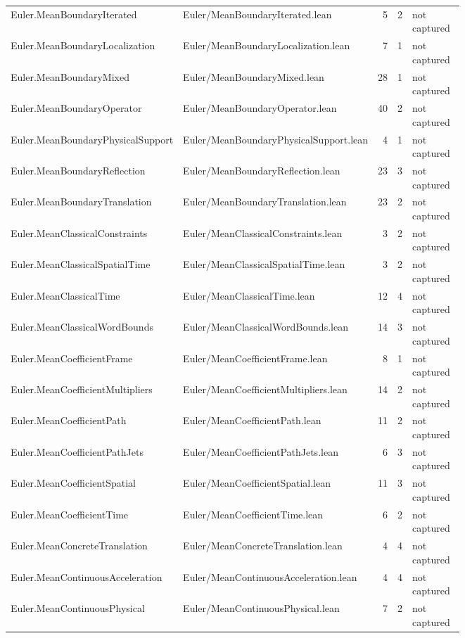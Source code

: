 \documentclass[10pt]{article}
\begin{document}
\begin{longtable}{p{0.28\linewidth}p{0.27\linewidth}r r p{0.20\linewidth}}
Euler.MeanBoundaryIterated & Euler/MeanBoundaryIterated.lean & 5 & 2 & not captured\\
Euler.MeanBoundaryLocalization & Euler/MeanBoundaryLocalization.lean & 7 & 1 & not captured\\
Euler.MeanBoundaryMixed & Euler/MeanBoundaryMixed.lean & 28 & 1 & not captured\\
Euler.MeanBoundaryOperator & Euler/MeanBoundaryOperator.lean & 40 & 2 & not captured\\
Euler.MeanBoundaryPhysicalSupport & Euler/MeanBoundaryPhysicalSupport.lean & 4 & 1 & not captured\\
Euler.MeanBoundaryReflection & Euler/MeanBoundaryReflection.lean & 23 & 3 & not captured\\
Euler.MeanBoundaryTranslation & Euler/MeanBoundaryTranslation.lean & 23 & 2 & not captured\\
Euler.MeanClassicalConstraints & Euler/MeanClassicalConstraints.lean & 3 & 2 & not captured\\
Euler.MeanClassicalSpatialTime & Euler/MeanClassicalSpatialTime.lean & 3 & 2 & not captured\\
Euler.MeanClassicalTime & Euler/MeanClassicalTime.lean & 12 & 4 & not captured\\
Euler.MeanClassicalWordBounds & Euler/MeanClassicalWordBounds.lean & 14 & 3 & not captured\\
Euler.MeanCoefficientFrame & Euler/MeanCoefficientFrame.lean & 8 & 1 & not captured\\
Euler.MeanCoefficientMultipliers & Euler/MeanCoefficientMultipliers.lean & 14 & 2 & not captured\\
Euler.MeanCoefficientPath & Euler/MeanCoefficientPath.lean & 11 & 2 & not captured\\
Euler.MeanCoefficientPathJets & Euler/MeanCoefficientPathJets.lean & 6 & 3 & not captured\\
Euler.MeanCoefficientSpatial & Euler/MeanCoefficientSpatial.lean & 11 & 3 & not captured\\
Euler.MeanCoefficientTime & Euler/MeanCoefficientTime.lean & 6 & 2 & not captured\\
Euler.MeanConcreteTranslation & Euler/MeanConcreteTranslation.lean & 4 & 4 & not captured\\
Euler.MeanContinuousAcceleration & Euler/MeanContinuousAcceleration.lean & 4 & 4 & not captured\\
Euler.MeanContinuousPhysical & Euler/MeanContinuousPhysical.lean & 7 & 2 & not captured\\

\end{longtable}
\end{document}
